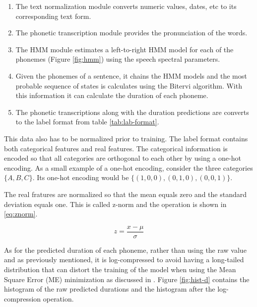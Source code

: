 \begin{enumerate}
    \item The text normalization module converts numeric values, dates, etc to its corresponding text form.
    \item The phonetic transcription module provides the pronunciation of the words.
    \item The HMM module estimates a left-to-right HMM model for each of the phonemes (Figure \ref{fig:hmm}) using the speech spectral parameters.
    \item Given the phonemes of a sentence, it chains the HMM models and the most probable sequence of states is calculates using the Bitervi algorithm. With this information it can calculate the duration of each phoneme.
    \item The phonetic transcriptions along with the duration predictions are converts to the label format from table \ref{tab:lab-format}.
\end{enumerate}

This data also has to be normalized prior to training. The label format contains both categorical features and real features. The categorical information is encoded so that all categories are orthogonal to each other by using a one-hot encoding. As a small example of a one-hot encoding, consider the three categories $\{A, B, C\}$. Its one-hot encoding would be $\{(1,0,0), (0,1,0), (0,0,1)\}$.

The real fratures are normalized so that the mean equals zero and the standard deviation equals one. This is called z-norm and the operation is shown in \ref{eq:znorm}.

\begin{equation}
    z = \frac{x - \mu}{\sigma}
    \label{eq:znorm}
\end{equation}

As for the predicted duration of each phoneme, rather than using the raw value and as previously mentioned, it is log-compressed to avoid having a long-tailed distribution that can distort the training of the model when using the Mean Square Error (ME) minimization as discussed in \cite{santi06}. Figure \ref{fig:hist-d} contains the histogram of the raw predicted durations and the histogram after the log-compression operation.

